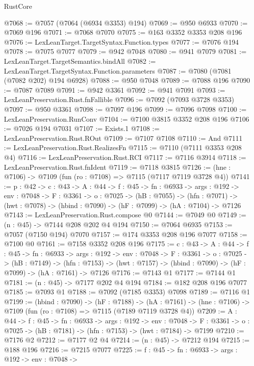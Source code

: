 \begin{lexlean}{RustCore}
\begin{coremodule}
@7068 := @7057 (@7064 (@6934 @3353) @194)
@7069 := @950 @6933
@7070 := @7069 @196
@7071 := @7068 @7070
@7075 := @163 @3352 @3353 @208 @196
@7076 := LexLeanTarget.TargetSyntax.Function.types
@7077 := @7076 @194
@7078 := @7075 @7077
@7079 := @942 @7048
@7080 := @941 @7079
@7081 := LexLeanTarget.TargetSemantics.bindAll
@7082 := LexLeanTarget.TargetSyntax.Function.parameters
@7087 := @7080 (@7081 (@7082 @202) @194 @6928)
@7088 := @950 @7048
@7089 := @7088 @196
@7090 := @7087 @7089
@7091 := @942 @3361
@7092 := @941 @7091
@7093 := LexLeanPreservation.Rust.fnFallible
@7096 := @7092 (@7093 @3728 @3353)
@7097 := @950 @3361
@7098 := @7097 @196
@7099 := @7096 @7098
@7100 := LexLeanPreservation.RunConv
@7104 := @7100 @3815 @3352 @208 @196
@7106 := @7026 @194 @7031
@7107 := Exists.{1}
@7108 := LexLeanPreservation.Rust.ROut
@7109 := @7107 @7108
@7110 := And
@7111 := LexLeanPreservation.Rust.RealizesFn
@7115 := @7110 (@7111 @3353 @208 @4)
@7116 := LexLeanPreservation.Rust.RCI
@7117 := @7116 @3914
@7118 := LexLeanPreservation.Rust.fnIdent
@7119 := @7118 @3815
@7126 := (hne : @7106) -> @7109 (fun (ro : @7108) => @7115 (@7117 @7119 @3728 @4))
@7141 := {p : @42} ->
  {c : @43} ->
  {A : @44} ->
  {f : @45} ->
  {fn : @6933} ->
  {args : @192} ->
  {env : @7048} ->
  {F : @3361} ->
  {o : @7025} ->
  (hB : @7055) ->
  (hfn : @7071) -> (hwt : @7078) -> (hbind : @7090) -> (hF : @7099) -> (hA : @7104) -> @7126
@7143 := LexLeanPreservation.Rust.compose @0
@7144 := @7049 @0
@7149 := (n : @45) -> @7144 @208 @202 @4 @194
@7150 := @7064 @6935
@7153 := @7057 (@7150 @194) @7070
@7157 := @174 @3353 @208 @196 @7077
@7158 := @7100 @0
@7161 := @7158 @3352 @208 @196
@7175 := {c : @43} ->
  {A : @44} ->
  {f : @45} ->
  {fn : @6933} ->
  {args : @192} ->
  {env : @7048} ->
  {F : @3361} ->
  {o : @7025} ->
  (hB : @7149) ->
  (hfn : @7153) -> (hwt : @7157) -> (hbind : @7090) -> (hF : @7099) -> (hA : @7161) -> @7126
@7176 := @7143 @1
@7177 := @7144 @1
@7181 := (n : @45) -> @7177 @202 @4 @194
@7184 := @182 @208 @196 @7077
@7185 := @7093 @1
@7188 := @7092 (@7185 @3353) @7098
@7189 := @7116 @1
@7199 := (hbind : @7090) ->
  (hF : @7188) ->
  (hA : @7161) -> (hne : @7106) -> @7109 (fun (ro : @7108) => @7115 (@7189 @7119 @3728 @4))
@7209 := {A : @44} ->
  {f : @45} ->
  {fn : @6933} ->
  {args : @192} ->
  {env : @7048} ->
  {F : @3361} -> {o : @7025} -> (hB : @7181) -> (hfn : @7153) -> (hwt : @7184) -> @7199
@7210 := @7176 @2
@7212 := @7177 @2 @4
@7214 := (n : @45) -> @7212 @194
@7215 := @188 @196
@7216 := @7215 @7077
@7225 := {f : @45} ->
  {fn : @6933} ->
  {args : @192} ->
  {env : @7048} ->

\end{coremodule}
\end{lexlean}
